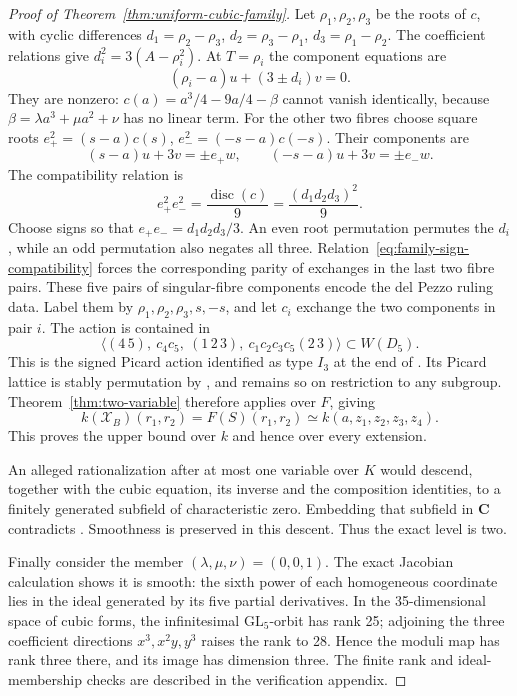 \documentclass[11pt]{article}
\theoremstyle{remark}
\newcommand{\C}{\mathbf C}
\begin{document}
\begin{proof}[Proof of Theorem~\ref{thm:uniform-cubic-family}]
Let \(\rho_1,\rho_2,\rho_3\) be the roots of \(c\), with cyclic
differences \(d_1=\rho_2-\rho_3\), \(d_2=\rho_3-\rho_1\),
\(d_3=\rho_1-\rho_2\). The coefficient relations give
\(d_i^2=3(A-\rho_i^2)\). At \(T=\rho_i\) the component equations are
\[
 (\rho_i-a)u+(3\pm d_i)v=0.
\]
They are nonzero: \(c(a)=a^3/4-9a/4-\beta\) cannot vanish identically,
because \(\beta=\lambda a^3+\mu a^2+\nu\) has no linear term.
For the other two fibres choose square roots
\(e_+^2=(s-a)c(s)\), \(e_-^2=(-s-a)c(-s)\). Their components are
\[
 (s-a)u+3v=\pm e_+w,\qquad
 (-s-a)u+3v=\pm e_-w.
\]
The compatibility relation is
\begin{equation}
 e_+^2e_-^2=\frac{\operatorname{disc}(c)}9
           =\frac{(d_1d_2d_3)^2}{9}.
 \label{eq:family-sign-compatibility}
\end{equation}
Choose signs so that \(e_+e_-=d_1d_2d_3/3\).
An even root permutation permutes the \(d_i\), while an odd permutation
also negates all three. Relation~\eqref{eq:family-sign-compatibility}
forces the corresponding parity of exchanges in the last two fibre pairs.
These five pairs of singular-fibre components encode the del Pezzo ruling
data. Label them by \(\rho_1,\rho_2,\rho_3,s,-s\), and let \(c_i\)
exchange the two components in pair \(i\). The action is contained in
\begin{equation}
 \langle(4\,5),\ c_4c_5,\ (1\,2\,3),\
 c_1c_2c_3c_5(2\,3)\rangle\subset W(D_5).
 \label{eq:family-signed-group}
\end{equation}
This is the signed Picard action identified as type \(I_3\) at the end of
\cite[Proposition~5.3]{TZ}. Its Picard lattice is stably permutation by
\cite[Lemma~4.2]{TZ}, and remains so on restriction to any subgroup.
Theorem~\ref{thm:two-variable} therefore applies over \(F\), giving
\[
 k(\mathcal X_B)(r_1,r_2)=F(S)(r_1,r_2)
 \simeq k(a,z_1,z_2,z_3,z_4).
\]
This proves the upper bound over \(k\) and hence over every extension.

An alleged rationalization after at most one variable over \(K\) would
descend, together with the cubic equation, its inverse and the composition
identities, to a finitely generated subfield of characteristic zero.
Embedding that subfield in \(\C\) contradicts
\cite[Theorem~1.1]{RuddM1}. Smoothness is preserved in this descent.
Thus the exact level is two.

Finally consider the member \((\lambda,\mu,\nu)=(0,0,1)\). The exact
Jacobian calculation shows it is smooth: the sixth power of each homogeneous
coordinate lies in the ideal generated by its five partial derivatives.
In the 35-dimensional space of cubic forms, the infinitesimal
\(\mathrm{GL}_5\)-orbit has rank 25; adjoining the three coefficient
directions \(x^3,x^2y,y^3\) raises the rank to 28. Hence the moduli map
has rank three there, and its image has dimension three. The finite rank
and ideal-membership checks are described in the verification appendix.
\uses{thm:two-variable}%
%
\evidence{sharpness-family-arithmetic}%
\end{proof}
\end{document}
